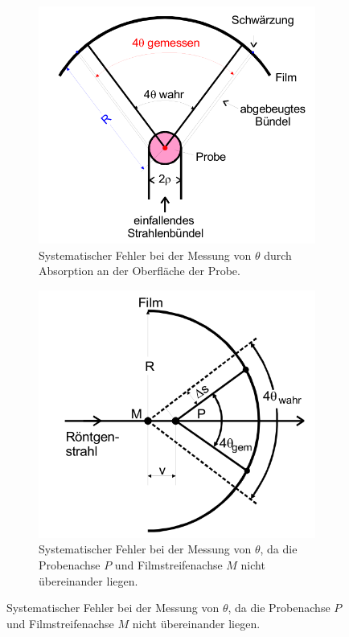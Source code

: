 \begin{figure}[hhh]
  \centering
  \begin{subfigure}{.49\textwidth}
    \centering
    \includegraphics[width=1\textwidth]{Syst_error_1.PNG}
    \caption{Systematischer Fehler bei der Messung von $\theta$ durch
    Absorption an der Oberfläche der Probe.\cite{sample}}
    \label{fig:error1}
  \end{subfigure}
  \begin{subfigure}{.49\textwidth}
    \centering
    \includegraphics[width=1\textwidth]{Syst_error_2.PNG}
    \caption{Systematischer Fehler bei
    der Messung von $\theta$, da die Probenachse $P$
     und Filmstreifenachse $M$ nicht übereinander liegen.\cite{sample}}
    \label{fig:error2}
  \end{subfigure}
\end{figure}


